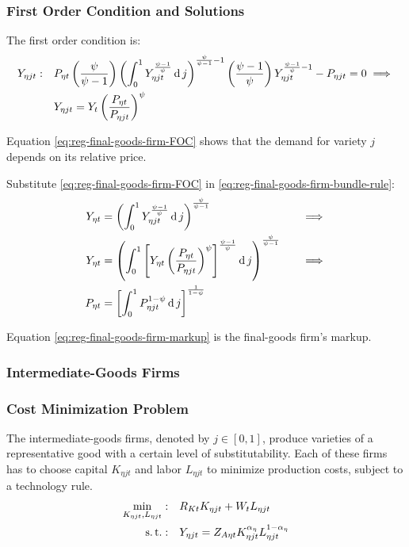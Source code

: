 \documentclass[
thesis.tex
]{subfiles}
\begin{document}
\subsubsection*{First Order Condition and Solutions}

The first order condition is:
\begin{align}
	Y_{\eta jt}:\quad & P_{\eta t} \left( \frac{\psi}{\psi-1} \right) \left( \int_{0}^{1} Y_{\eta jt}^{\frac{\psi-1}{\psi}} \operatorname{d} j \right)^{\frac{\psi}{\psi-1}-1} \left( \frac{\psi-1}{\psi} \right) Y_{\eta jt}^{\frac{\psi-1}{\psi}-1} - P_{\eta jt} = 0 \implies \nonumber \\
	\label{eq:reg-final-goods-firm-FOC}
	& Y_{\eta jt} = Y_{t} \left( \frac{P_{\eta t}}{P_{\eta jt}} \right)^{\psi}
\end{align}

Equation \ref{eq:reg-final-goods-firm-FOC} shows that the demand for variety $j$ depends on its relative price. 

Substitute \ref{eq:reg-final-goods-firm-FOC} in \ref{eq:reg-final-goods-firm-bundle-rule}:
\begin{alignat}{2}
	Y_{\eta t} & = \left( \int_{0}^{1} Y_{\eta jt}^{\frac{\psi-1}{\psi}} \operatorname{d} j \right)^{\frac{\psi}{\psi-1}} &\implies \nonumber \\
	Y_{\eta t} & = \left( \int_{0}^{1} \left[ Y_{\eta t} \left( \frac{P_{\eta t}}{P_{\eta jt}} \right)^{\psi} \right]^{\frac{\psi-1}{\psi}} \operatorname{d} j \right)^{\frac{\psi}{\psi-1}} \quad &\implies \nonumber \\
	P_{\eta t} & = \left[ \int_{0}^{1} P_{\eta jt}^{1-\psi} \operatorname{d} j \right]^{\frac{1}{1-\psi}} \label{eq:reg-final-goods-firm-markup}
\end{alignat}

Equation \ref{eq:reg-final-goods-firm-markup} is the final-goods firm's markup.


\subsubsection{Intermediate-Goods Firms}

\subsubsection*{Cost Minimization Problem}

The intermediate-goods firms, denoted by $j \in [0,1]$, produce varieties of a representative good with a certain level of substitutability. Each of these firms has to choose capital $K_{\eta jt}$ and labor $L_{\eta jt}$ to minimize production costs, subject to a technology rule.
\begin{align}
	\label{eq:reg-int-good-firm-total-cost}
	\min_{K_{\eta jt}, L_{\eta jt}}: \quad & R_{Kt} K_{\eta jt} + W_t L_{\eta jt} \\
	\label{eq:reg-int-good-firm-production-function}
	\operatorname{s.t.}: \quad & Y_{\eta jt} = Z_{A\eta t} K_{\eta jt}^{\alpha_{\eta}} L_{\eta jt}^{1-{\alpha_{\eta}}}
\end{align}
\end{document}
